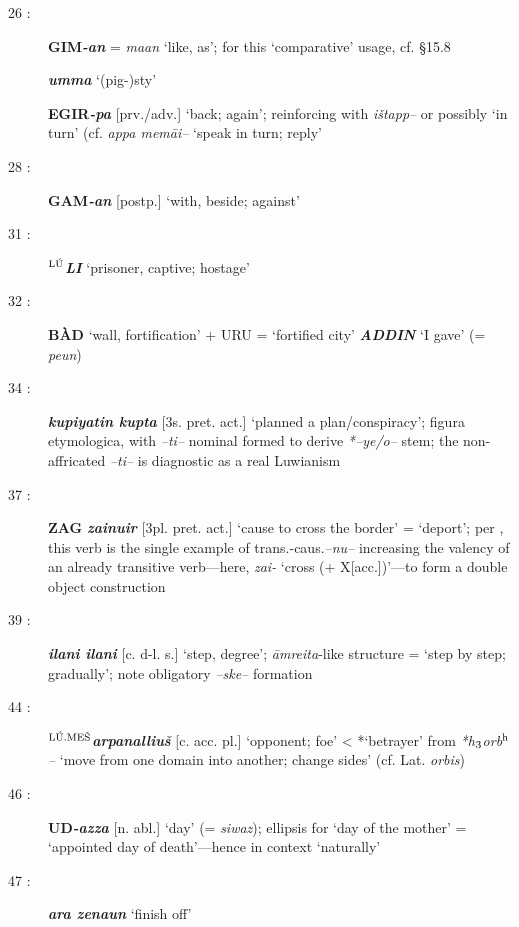 \documentclass[10pt]{article}
\newcommand{\supersc}[1]{$^{\textrm{\scriptsize{#1}}}$}  	%
\newcommand{\subsc}[1]{$_{\textrm{\scriptsize{#1}}}$}	%
\newcommand{\bit}[1]{\textbf{\textit{#1}}}				%
\newcommand{\p}[1]{{\tiny[{#1}]}}					%
\newcommand{\bh}{b\supersc{h}}							%
\newcommand{\hiii}{h\subsc{3}}								%
\newcommand{\hith}{\textsubwedge{h}}
\newcommand{\man}{\supersc{L\'U}}
\newcommand{\men}{\supersc{L\'U.ME\v{S}}}
\renewcommand{\.}[1]{\textsubdot{#1}}
\begin{document}
\begin{description}
\item[26 :] \textbf{GIM}\bit{-an} = \textit{ma{\hith\hith}an} `like, as'; for this `comparative' usage, cf.  \S15.8 

\bit{{\hith}umma} `(pig-)sty'

\textbf{EGIR}\bit{-pa} \p{prv./adv.} `back; again'; reinforcing with \textit{i\v{s}tapp--} or possibly `in turn' (cf. \textit{appa mem\=ai--} `speak in turn; reply'

\item[28 :] \textbf{GAM}\bit{-an} \p{postp.} `with, beside; against'

\item[31 :] \textbf{\man}\bit{LI} `prisoner, captive; hostage'

\item[32 :] \textbf{B\`AD} `wall, fortification' + URU = `fortified city' \bit{ADDIN} `I gave' (= \textit{pe{\hith\hith}un})

\item[34 :] \bit{kupiyatin kupta} \p{3s. pret. act.} `planned a plan/conspiracy'; figura etymologica, with \textit{--ti--} nominal formed to derive \textit{*--ye/o--} stem; the non-affricated \textit{--ti--} is diagnostic as a real Luwianism

\item[37 :] \textbf{ZAG}\bit{ zainuir} \p{3pl. pret. act.} `cause to cross the border' = `deport'; per \citet{luraghi2012valency}, this verb is the single example of trans.-caus.\textit{--nu--} increasing the valency of an already transitive verb---here, \textit{zai-} `cross (+ X\p{acc.})'---to form a double object construction

\item[39 :] \bit{ilani ilani} \p{c. d-l. s.} `step, degree'; \textit{\=amreita}-like structure  = `step by step; gradually'; note obligatory \textit{--ske--} formation

\item[44 :] \textbf{\men}\bit{{\hith}arpanalliu\v{s}} \p{c. acc. pl.} `opponent; foe' < *`betrayer' from \textit{*{\hiii}or{\bh}--} `move from one domain into another; change sides' (cf. Lat. \textit{orbis}) 

\item[46 :] \textbf{UD}\bit{-azza} \p{n. abl.} `day' (= \textit{siwaz}); ellipsis for `day of the mother' = `appointed day of death'---hence in context `naturally' 

\item[47 :] \bit{ar{\hith}a zena{\hith\hith}un} `finish off'


\end{description}
\end{document}

